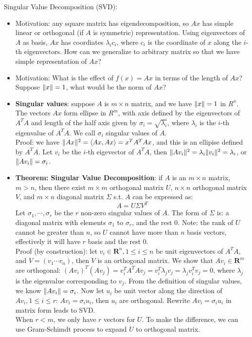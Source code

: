 \documentclass{report}
\begin{document}
Singular Value Decomposition (SVD): 
\begin{itemize}
	\item Motivation: any square matrix has eigendecomposition, so $Ax$ has simple linear or orthogonal (if $A$ is symmetric) representation. Using eigenvectors of $A$ as basis, $Ax$ has coordiates $\lambda_i c_i$, where $c_i$ is the coordinate of $x$ along the $i$-th eigenvectors. How can we generalize to arbitrary matrix so that we have simple representation of $Ax$? 
	
	\item Motivation: What is the effect of $f(x) = A x$ in terms of the length of $Ax$? Suppose $\lVert x\rVert = 1$, what would be the norm of $Ax$? 
		
	\item \textbf{Singular values}: suppose $A$ is $m \times n$ matrix, and we have $\lVert x\rVert = 1$ in $R^n$. The vectors $Ax$ form ellipse in $R^m$, with axis defined by the eigenvectors of $A^T A$ and length of the half axis given by $\sigma_i = \sqrt{\lambda_i}$, where $\lambda_i$ is the $i$-th eigenvalue of $A^T A$. We call $\sigma_i$ singular values of $A$. \\
	Proof: we have $\lVert Ax\rVert^2 = \langle Ax, Ax \rangle = x^T A^T A x$, and this is an ellipise defined by $A^T A$. Let $v_i$ be the $i$-th eigevector of $A^T A$, then $\lVert A v_i\rVert^2 = \lambda_i \lVert v_i\rVert^2 = \lambda_i$, or $\lVert A v_i\rVert = \sigma_i$. 	
	
\item \textbf{Theorem: Singular Value Decomposition}: if $A$ is an $m \times n$ matrix, $m > n$, then there exist $m \times m$ orthogonal matrix $U$, $n \times n$ orthogonal matrix $V$, and $m \times n$ diagonal matrix $\Sigma$ s.t. $A$ can be expressed as: 
\begin{equation}
A = U \Sigma V^T	
\end{equation}
Let $\sigma_1, \cdots, \sigma_r$ be the $r$ non-zero singular values of $A$. The form of $\Sigma$ is: a diagonal matrix with elements $\sigma_1$ to $\sigma_r$, and the rest 0. Note: the rank of $U$ cannot be greater than $n$, so $U$ cannot have more than $n$ basis vectors, effectively it will have $r$ basis and the rest 0.\\
Proof (by construction): let $v_i \in \mathbf{R}^n, 1 \leq i \leq n$ be unit eigenvectors of $A^T A$, and $V = (v_1 \cdots v_n)$, then $V$ is an orthogonal matrix. We show that $Av_i \in \mathbf{R}^m$ are orthogonal: $(Av_i)^T (A v_j) = v_i^T A^T A v_j = v_i^T \lambda_j v_j = \lambda_j v_i^T v_j = 0$, where $\lambda_j$ is the eigenvalue corresponding to $v_j$. From the definition of singular values, we know $\lVert Av_i\rVert = \sigma_i$. Now let $u_i$ be unit vector along the direction of $Av_i, 1 \leq i \leq r$: $A v_i = \sigma_i u_i$, then $u_i$ are orthogonal. Rewrite $A v_i = \sigma_i u_i$ in matrix form leads to SVD. \\
When $r < m$, we only have $r$ vectors for $U$. To make the difference, we can use Gram-Schimdt process to expand $U$ to orthogonal matrix. 


\end{itemize}
\end{document}
